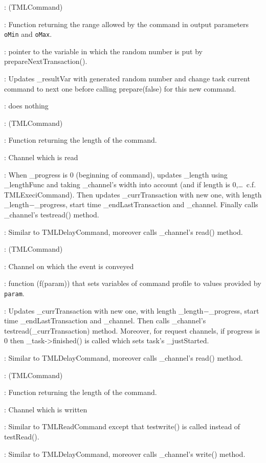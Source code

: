 \documentclass[a4paper,11pt]{article}
\newcommand{\bfont}{\fontseries{b}\selectfont}
\newcommand{\cod}[1]{{\ttfamily #1}}
\newcommand{\class}[2]{\par\vspace{1mm}\hspace{-5mm}\large\colorbox{file}{\textbullet\bfont\cod{#1}:} (\cod{#2})\par}
\newcommand{\method}[1]{\par\vspace{1mm}\hspace{-2mm}\colorbox{method}{\textopenbullet\bfont\cod{#1}:}}
\newcommand{\variable}[1]{\par\vspace{1mm}\hspace{-2mm}\colorbox{variable}{\textopenbullet\bfont\cod{#1}:}}
\begin{document}
\class{TMLRandomCommand}{TMLCommand}
\variable{\_rangeFunc} Function returning the range allowed by the command in output parameters {\tt oMin} and {\tt oMax}.
\variable{*\_resultVar} pointer to the variable in which the random number is put by \cod{prepare\-NextTransaction()}.
\method{prepareNextTransaction()} Updates \cod{\_resultVar} with generated random number and change task current command to next one before calling \cod{prepare(false)} for this new command.
\method{execute()} does nothing

\class{TMLReadCommand}{TMLCommand}
\variable{\_lengthFunc} Function returning the length of the command.
\variable{\_channel} Channel which is read
\method{prepareNextTransaction()} When \cod{\_prog\-ress} is 0 (beginning of command), updates \cod{\_length} using \cod{\_lengthFunc} and taking \cod{\_channel}'s width into account (and if length is 0,\ldots\ c.f. \cod{TMLExeciCommand}). Then updates \cod{\_currTransaction} with new one, with length \cod{\_length}$-$\cod{\_progress}, start time \cod{\_endLastTransaction} and \cod{\_channel}. Finally calls \cod{\_channel}'s \cod{testread()} method.
\method{execute()} Similar to \cod{TMLDelayCommand}, moreover calls \cod{\_channel}'s \cod{read()} method.

\class{TMLWaitCommand}{TMLCommand}
\variable{\_channel} Channel on which the event is conveyed
\variable{\_paramFunc} function (\cod{f(param)}) that sets variables of command profile to values provided by {\tt param}. 
\method{prepareNextTransaction()} Updates \cod{\_currTransaction} with new one, with length \cod{\_length}$-$\cod{\_progress}, start time \cod{\_endLastTransaction} and \cod{\_channel}. Then calls \cod{\_chan\-nel}'s \cod{testread(\_currTransaction)} method. Moreover, for request channels,  if progress is 0 then \cod{\_task->finished()} is called which sets task's \cod{\_justStarted}. 
\method{execute()} Similar to \cod{TMLDelayCommand}, moreover calls \cod{\_channel}'s \cod{read()} method.

\class{TMLWriteCommand}{TMLCommand}
\variable{\_lengthFunc} Function returning the length of the command.
\variable{\_channel} Channel which is written
\method{prepareNextTransaction()} Similar to \cod{TMLReadCommand} except that \cod{testwrite()} is called instead of \cod{testRead()}.
\method{execute()} Similar to \cod{TMLDelayCommand}, moreover calls \cod{\_channel}'s \cod{write()} method.
\end{document}
